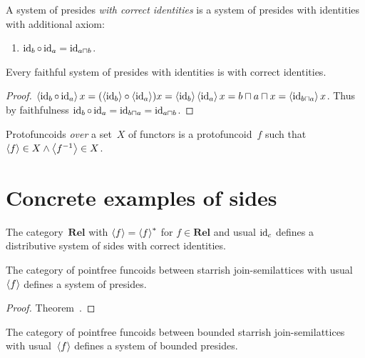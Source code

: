 \begin{defn}
A system of presides \emph{with correct identities} is a system of presides with identities with additional axiom:
\begin{enumerate}
\item $\operatorname{id}_b\circ\operatorname{id}_a = \operatorname{id}_{a\sqcap b}$.
\end{enumerate}
\end{defn}

\begin{prop}
Every faithful system of presides with identities is with correct identities.
\end{prop}

\begin{proof}
$\left\langle \operatorname{id}_b\circ\operatorname{id}_a\right\rangle x = (\left\langle \operatorname{id}_b\right\rangle\circ\left\langle \operatorname{id}_a\right\rangle)x = \left\langle \operatorname{id}_b\right\rangle\left\langle \operatorname{id}_a\right\rangle x = b\sqcap a\sqcap x = \left\langle \operatorname{id}_{b\sqcap a}\right\rangle x$.
Thus by faithfulness $\operatorname{id}_b\circ\operatorname{id}_a = \operatorname{id}_{b\sqcap a} = \operatorname{id}_{a\sqcap b}$.
\end{proof}

\begin{defn}
Protofuncoids \emph{over} a set~$X$ of functors is a protofuncoid~$f$
such that $\left\langle f\right\rangle\in X\land\left\langle f^{-1}\right\rangle\in X$.
\end{defn}

\section{Concrete examples of sides}


\begin{obvious}
The category~$\mathbf{Rel}$ with $\left\langle f\right\rangle=\left\langle f\right\rangle ^{\ast}$ for $f\in\mathbf{Rel}$ and usual $\operatorname{id}_c$ defines a distributive system of sides with correct identities.
\end{obvious}

\begin{prop}
The category of pointfree funcoids between starrish join-semilattices with usual~$\left\langle f\right\rangle$ defines a system of presides.
\end{prop}

\begin{proof}
Theorem~.
\end{proof}

\begin{prop}
The category of pointfree funcoids between bounded starrish join-semilattices with usual~$\left\langle f\right\rangle$ defines a system of
bounded presides.
\end{prop}

